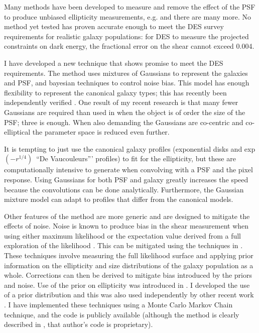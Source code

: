 \documentclass[12pt]{article}
\newcommand{\devauc}{De Vaucouleurs'}
\newcommand{\devprof}{exp$(-r^{1/4})$}
\begin{document}
Many methods have been developed to measure and remove the effect of the PSF to
produce unbiased ellipticity measurements, e.g.
\cite{ksb95,Bern02,Miller07,Melchior11} and there are many more.  No method yet
tested has proven accurate enough to meet the DES survey requirements for
realistic galaxy populations:  for DES to measure the projected constraints on
dark energy, the fractional error on the shear cannot exceed 0.004.

I have developed a new technique that shows promise to meet the DES
requirements.  The method uses mixtures of Gaussians to represent the galaxies
and PSF, and bayesian techniques to control noise bias.  This model has enough
flexibility to represent the canonical galaxy types; this has recently been
independently verified \citep{HoggGMix12}.  One result of my recent research is
that many fewer Gaussians are required than used in \cite{HoggGMix12} when the
object is of order the size of the PSF; three is enough.  When also demanding
the Gaussians are co-centric and co-elliptical the parameter space is reduced
even further.  

It is tempting to just use the canonical galaxy profiles (exponential disks and
\devprof\ ``\devauc'' profiles) to fit for the ellipticity, but these are
computationally intensive to generate when convolving with a PSF and the pixel
response.  Using Gaussians for both PSF and galaxy greatly increases the speed
because the convolutions can be done analytically.   Furthermore, the Gaussian
mixture model can adapt to profiles that differ from the canonical models.

Other features of the method are more generic and are designed to mitigate the
effects of noise.  Noise is known to produce bias in the shear measurement when
using either maximum likelihood \cite{Refreg12} or the expectation value
derived from a full exploration of the likelihood \cite{Miller12}.  This can be
mitigated using the techniques in \cite{Miller07,Miller12}. These techniques
involve measuring the full likelihood surface and applying prior information on
the ellipticity and size distributions of the galaxy population as a whole.
Corrections can then be derived to mitigate bias introduced by the priors and
noise.  Use of the prior on ellipticity was introduced in \cite{Miller07}. I
developed the use of a prior distribution and this was also used independently
by other recent work \cite{Miller12}.  I have implemented these techniques
using a Monte Carlo Markov Chain technique, and the code is publicly available
(although the method is clearly described in \cite{Miller07}, that author's
code is proprietary).
\end{document}
